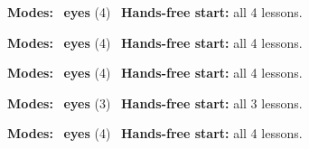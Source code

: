 \expandafter\def\csname hlchaptermodality32\endcsname{%
  {\small\noindent
    \textbf{Modes:} \hlsightsign{}~\textbf{eyes} (4)\quad
    \hlvoicesign{}~\textbf{Hands-free start:} all 4 lessons.%
    \par}\medskip
}

\expandafter\def\csname hlchaptermodality33\endcsname{%
  {\small\noindent
    \textbf{Modes:} \hlsightsign{}~\textbf{eyes} (4)\quad
    \hlvoicesign{}~\textbf{Hands-free start:} all 4 lessons.%
    \par}\medskip
}

\expandafter\def\csname hlchaptermodality34\endcsname{%
  {\small\noindent
    \textbf{Modes:} \hlsightsign{}~\textbf{eyes} (4)\quad
    \hlvoicesign{}~\textbf{Hands-free start:} all 4 lessons.%
    \par}\medskip
}

\expandafter\def\csname hlchaptermodality35\endcsname{%
  {\small\noindent
    \textbf{Modes:} \hlsightsign{}~\textbf{eyes} (3)\quad
    \hlvoicesign{}~\textbf{Hands-free start:} all 3 lessons.%
    \par}\medskip
}

\expandafter\def\csname hlchaptermodality36\endcsname{%
  {\small\noindent
    \textbf{Modes:} \hlsightsign{}~\textbf{eyes} (4)\quad
    \hlvoicesign{}~\textbf{Hands-free start:} all 4 lessons.%
    \par}\medskip
}
